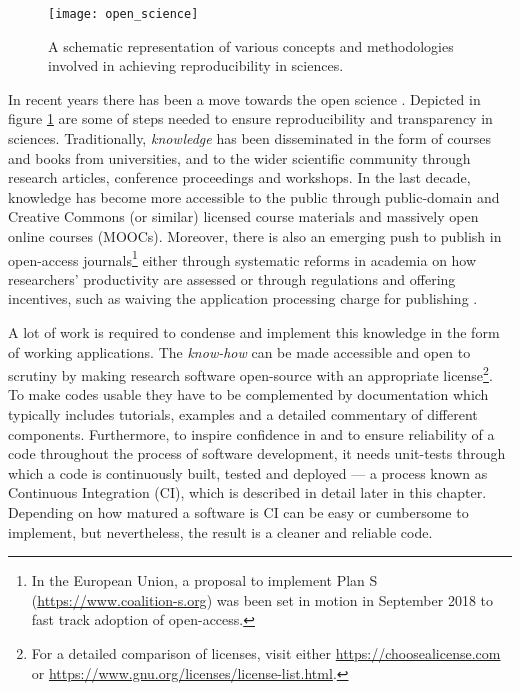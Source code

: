 \begin{figure}[h]
  \centering
  \texttt{[image: open\_science]}
  \caption{A schematic representation of various concepts and methodologies
  involved in achieving reproducibility in sciences.}\label{fig:opensci}
\end{figure}

In recent years there has been a move towards the open science
\citep[see the report by][]{royal_society_great_britain_science_2012}.
%
Depicted in figure \ref{fig:opensci} are some of steps needed to ensure
reproducibility and transparency in sciences.
%
Traditionally, \emph{knowledge} has been disseminated in the form of courses
and books from universities, and to the wider scientific community through
research articles, conference proceedings and workshops.
%
In the last decade, knowledge has become more accessible to the public
through public-domain and Creative Commons (or similar) licensed course
materials and massively open online courses (MOOCs). Moreover, there is also an
emerging push to publish in open-access journals\footnote{In the European
  Union, a proposal to implement Plan S (\url{https://www.coalition-s.org}) was
  been set in motion in September 2018 to fast track adoption of open-access.
} either through systematic
reforms in academia on how researchers' productivity are assessed or through
regulations and offering incentives, such as waiving the application processing
charge for publishing \citep{nosek_promoting_2015}.

A lot of work is required to condense and implement this knowledge in the
form of working applications.
%
The \emph{know-how} can be made accessible and open to scrutiny by making
research software open-source with an appropriate license\footnote{For a
  detailed comparison of licenses, visit either
  \url{https://choosealicense.com} or
  \url{https://www.gnu.org/licenses/license-list.html}.
}.
%
To make codes usable they have to be complemented by documentation which
typically includes tutorials, examples and a detailed commentary of different
components.
%
Furthermore, to inspire confidence in and to ensure reliability of a code
throughout the process of software development, it needs unit-tests through
which a code is continuously built, tested and deployed --- a process known as
Continuous Integration (CI), which is described in detail later in this
chapter. Depending on how matured a software is CI can be easy or
cumbersome to implement, but nevertheless, the result is a cleaner and reliable
code.

